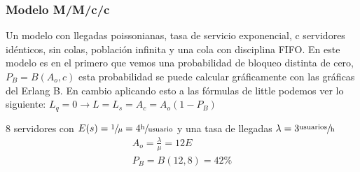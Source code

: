 \subsubsection{Modelo M/M/c/c}
Un modelo con llegadas poissonianas, tasa de servicio exponencial, c servidores idénticos, sin colas, población infinita y una cola con disciplina \acrshort{FIFO}. En este modelo es en el primero que vemos una probabilidad de bloqueo distinta de cero, $P_B=B(A_o,c)$ esta probabilidad se puede calcular gráficamente con las gráficas del Erlang B. En cambio aplicando esto a las fórmulas de little podemos ver lo siguiente: $L_q=0\to L=L_s=A_c=A_o(1-P_B)$\\
\begin{example}[M/M/c/c]
8 servidores con $E(s)=\sfrac{1}{\mu}=4\sfrac{\text{h}}{\text{usuario}}$ y una tasa de llegadas $\lambda=3\sfrac{\text{usuarios}}{\text{h}}$\\
\begin{gather*}
A_o=\frac{\lambda}{\mu}=12E\\
P_B=B(12,8)=42\%
\end{gather*}
\end{example}